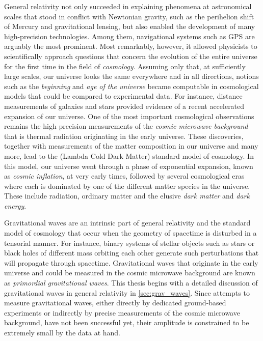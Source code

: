 \documentclass[12pt,parskip=half]{scrreprt}
\newcommand{\addref}{\todo[color=black!20]{ref.}}
\begin{document}
General relativity not only succeeded in explaining phenomena at astronomical scales that stood in conflict with Newtonian gravity, such as the perihelion shift of Mercury and gravitational lensing, \addref but also enabled the development of many high-precision technologies. Among them, navigational systems such as GPS are arguably the most prominent. \addref Most remarkably, however, it allowed physicists to scientifically approach questions that concern the evolution of the entire universe for the first time in the field of \emph{cosmology}. Assuming only that, at sufficiently large scales, our universe looks the same everywhere and in all directions, notions such as the \emph{beginning} and \emph{age of the universe} became computable in cosmological models that could be compared to experimental data. For instance, distance measurements of galaxies and stars provided evidence of a recent accelerated expansion of our universe. One of the most important cosmological observations remains the high precision measurements of the \emph{cosmic microwave background} that is thermal radiation originating in the early universe. \addref These discoveries, together with measurements of the matter composition in our universe and many more,  lead to the \LCDM (Lambda Cold Dark Matter) standard model of cosmology. \addref In this model, our universe went through a phase of exponential expansion, known as \emph{cosmic inflation}, at very early times, followed by several cosmological eras where each is dominated by one of the different matter species in the universe. These include radiation, ordinary matter and the elusive \emph{dark matter} and \emph{dark energy}.

Gravitational waves are an intrinsic part of general relativity and the standard model of cosmology that occur when the geometry of spacetime is disturbed in a tensorial manner. For instance, binary systems of stellar objects such as stars or black holes of different mass orbiting each other generate such perturbations that will propagate through spacetime. Gravitational waves that originate in the early universe and could be measured in the cosmic microwave background are known as \emph{primordial gravitational waves}. This thesis begins with a detailed discussion of gravitational waves in general relativity in \autoref{sec:grav_waves}. Since attempts to measure gravitational waves, either directly by dedicated ground-based experiments or indirectly by precise measurements of the cosmic microwave background, have not been successful yet, their amplitude is constrained to be extremely small by the data at hand. \addref
\end{document}
